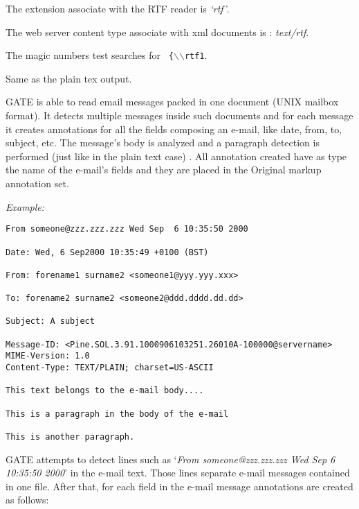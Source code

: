 The extension associate with the RTF reader is {\em `rtf'}.

The web server content type associate with xml documents is : {\em
text/rtf}.

The magic numbers test searches for {\tt
\{$\backslash$$\backslash$rtf1}.


Same as the plain tex output.




GATE is able to read email messages packed in one document (UNIX
mailbox format). It detects multiple messages inside such
documents and for each message it creates annotations for all the
fields composing an e-mail, like date, from, to, subject, etc. The
message's body is analyzed and a paragraph detection is performed
(just like in the plain text case) . All annotation created have
as type the name of the e-mail's fields and they are placed in the
Original markup annotation set.

{\em Example:}

\small
\begin{small}
\begin{verbatim}
From someone@zzz.zzz.zzz Wed Sep  6 10:35:50 2000

Date: Wed, 6 Sep2000 10:35:49 +0100 (BST)

From: forename1 surname2 <someone1@yyy.yyy.xxx>

To: forename2 surname2 <someone2@ddd.dddd.dd.dd>

Subject: A subject

Message-ID: <Pine.SOL.3.91.1000906103251.26010A-100000@servername>
MIME-Version: 1.0
Content-Type: TEXT/PLAIN; charset=US-ASCII

This text belongs to the e-mail body....

This is a paragraph in the body of the e-mail

This is another paragraph.
\end{verbatim}
\end{small}
\nnormalsize

GATE attempts to detect lines such as `{\em From someone@zzz.zzz.zzz Wed Sep  6
10:35:50 2000}' in the e-mail text. Those lines separate e-mail messages
contained in one file. After that, for each field in the e-mail message
annotations are created as follows:

